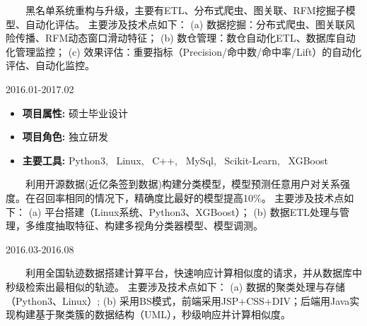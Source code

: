 \documentclass{resume}
\begin{document}
{{\begin{itemize} [parsep=0.5ex]
\end{itemize}


{  \ \ \ \ 黑名单系统重构与升级，主要有ETL、分布式爬虫、图关联、RFM挖掘子模型、自动化评估。
主要涉及技术点如下：
(a) 数据挖掘：分布式爬虫、图关联风险传播、RFM动态窗口滑动特征；
(b) 数仓管理：数仓自动化ETL、数据库自动化管理监控；
(c) 效果评估：重要指标（Precision/命中数/命中率/Lift）的自动化评估、自动化监控。}

\medskip










                   {2016.01-2017.02}

\begin{itemize} [parsep=0.3ex]

\item   \textbf{ 项目属性: }   {硕士毕业设计}
\item   \textbf{ 项目角色: }   {独立研发}    
\item   \textbf{ 主要工具: }  { Python3,  \ Linux,  \ C++,  \ MySql,  \ Scikit-Learn,  \ XGBoost }

\end{itemize}


{ \ \ \ \ 利用开源数据(近亿条签到数据)构建分类模型，模型预测任意用户对关系强度。在召回率相同的情况下，精确度比最好的模型提高10\%。
主要涉及技术点如下：
(a) 平台搭建（Linux系统、Python3、XGBoost）；
(b) 数据ETL处理与管理，多维度抽取特征、构建多视角分类器模型、模型调测。}

\medskip










                                 {2016.03-2016.08}

{ \ \ \ \ 利用全国轨迹数据搭建计算平台，快速响应计算相似度的请求，并从数据库中秒级检索出最相似的轨迹。
主要涉及技术点如下：
(a) 数据的聚类处理与存储（Python3、Linux）;
(b) 采用BS模式，前端采用JSP+CSS+DIV；后端用Java实现构建基于聚类簇的数据结构（UML），秒级响应并计算相似度。 }

\medskip










}}
\end{document}
